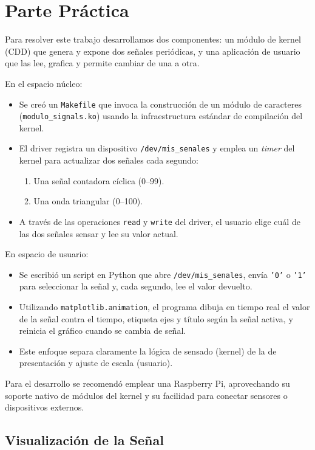 \section{Parte Práctica}

Para resolver este trabajo desarrollamos dos componentes: un módulo de kernel (CDD) que genera y expone dos señales periódicas, y una aplicación de usuario que las lee, grafica y permite cambiar de una a otra.

En el espacio núcleo:
\begin{itemize}
  \item Se creó un \texttt{Makefile} que invoca la construcción de un módulo de caracteres (\texttt{modulo\_signals.ko}) usando la infraestructura estándar de compilación del kernel.
  \item El driver registra un dispositivo \texttt{/dev/mis\_senales} y emplea un \emph{timer} del kernel para actualizar dos señales cada segundo:
    \begin{enumerate}
      \item Una señal contadora cíclica (0–99).
      \item Una onda triangular (0–100).
    \end{enumerate}
  \item A través de las operaciones \texttt{read} y \texttt{write} del driver, el usuario elige cuál de las dos señales sensar y lee su valor actual.
\end{itemize}

En espacio de usuario:
\begin{itemize}
  \item Se escribió un script en Python que abre \texttt{/dev/mis\_senales}, envía \texttt{'0'} o \texttt{'1'} para seleccionar la señal y, cada segundo, lee el valor devuelto.
  \item Utilizando \texttt{matplotlib.animation}, el programa dibuja en tiempo real el valor de la señal contra el tiempo, etiqueta ejes y título según la señal activa, y reinicia el gráfico cuando se cambia de señal.
  \item Este enfoque separa claramente la lógica de sensado (kernel) de la de presentación y ajuste de escala (usuario).
\end{itemize}

Para el desarrollo se recomendó emplear una Raspberry Pi, aprovechando su soporte nativo de módulos del kernel y su facilidad para conectar sensores o dispositivos externos.

\subsection{Visualización de la Señal}


